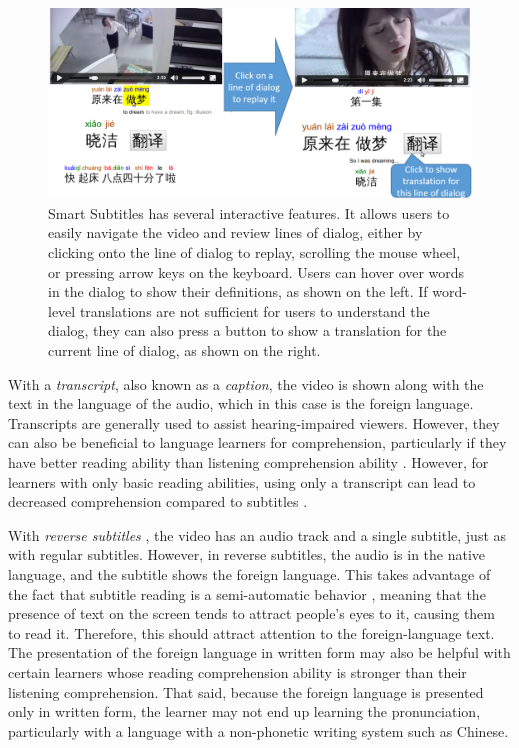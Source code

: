 \documentclass{sigchi}
\begin{document}
\begin{figure}[bp]
\centering
\includegraphics[width=2\columnwidth]{seekdialog-horizontal-translate-cropped2}
\caption{Smart Subtitles has several interactive features. It allows users to easily navigate the video and
review lines of dialog, either by clicking onto the line of dialog to replay,
scrolling the mouse wheel,
or pressing arrow keys on the keyboard. Users can hover over words
in the dialog to show their definitions, as shown on the left.
If word-level translations are not sufficient for users to understand the dialog, they can also press a button to show a translation for the current
line of dialog, as shown on the right.}
\label{fig:figure25}
\end{figure}

With a \emph{transcript}, also known as a \emph{caption}, the video is shown along with the text in the
language of the audio, which in this case is the foreign language. Transcripts are generally used to
assist hearing-impaired viewers. However, they can also be beneficial to language learners for
comprehension, particularly if they have better reading ability than
listening comprehension ability \cite{danan2004captioning}. However,
for learners with only basic reading abilities,
using only a transcript can lead to decreased comprehension compared to subtitles \cite{bianchi2008captions}.



With \emph{reverse subtitles} \cite{danan1992reversed}, the video has an audio track and a single subtitle, just as with regular
subtitles. However, in reverse subtitles, the audio is in the native language, and
the subtitle shows the foreign language. This takes advantage of the fact that subtitle reading is
a semi-automatic behavior \cite{d2002foreign}, meaning that the presence of text on the screen tends to attract
people's eyes to it, causing them to read it. Therefore, this should attract attention to the foreign-language text. The presentation of the foreign language in written form may also be helpful with
certain learners whose reading comprehension ability is stronger than their listening
comprehension. That said, because the foreign language is presented only in written form, the
learner may not end up learning the pronunciation, particularly with a language with a non-phonetic writing system such as Chinese.
\end{document}
